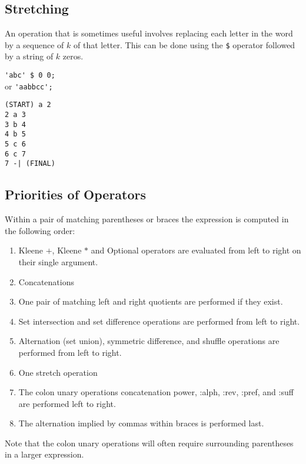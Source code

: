 \subsection{Stretching}
An operation that is sometimes useful involves replacing each letter in the
word by a sequence of $k$ of that letter.
This can be done using the \verb#$# operator followed by a string of $k$
zeros.
\begin{center}\begin{minipage}[t]{3in}\begin{minipage}[t]{3in}\begin{tabbing}
\qquad \= \verb#'abc' $ 0 0;#\\
or \> \verb#'aabbcc';#
\end{tabbing}\end{minipage}\end{minipage}
\begin{minipage}[t]{1.6in}\begin{verbatim}
(START) a 2
2 a 3
3 b 4
4 b 5
5 c 6
6 c 7
7 -| (FINAL)
\end{verbatim}\end{minipage}\end{center}

\subsection{Priorities of Operators}
Within a pair of matching parentheses or braces the expression is computed in
the following order:
\begin{enumerate}
\item Kleene $+$, Kleene $*$ and Optional operators are evaluated from left
to right on their single argument.
\item Concatenations
\item One pair of matching left and right quotients are performed if they
exist.
\item Set intersection and set difference operations are performed from
left to right.
\item Alternation (set union), symmetric difference, and shuffle operations
are performed from left to right.
\item One stretch operation
\item The colon unary operations concatenation power, :alph, :rev, :pref, and
:suff are performed left to right.
\item The alternation implied by commas within braces is performed last.
\end{enumerate}
Note that the colon unary operations will often require surrounding
parentheses in a larger expression.

